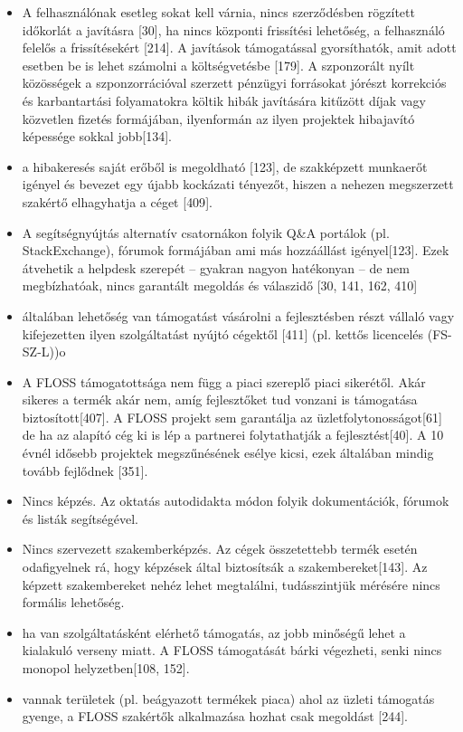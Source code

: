 \documentclass[12pt,magyar,a4paper,oneside]{scrreprt}
\providecommand{\tightlist}{%
  \setlength{\itemsep}{0pt}\setlength{\parskip}{0pt}}
\begin{document}
\begin{itemize}
\tightlist
\item
  A felhasználónak esetleg sokat kell várnia, nincs szerződésben
  rögzített időkorlát a javításra {[}30{]}, ha nincs központi frissítési
  lehetőség, a felhasználó felelős a frissítésekért {[}214{]}. A
  javítások támogatással gyorsíthatók, amit adott esetben be is lehet
  számolni a költségvetésbe {[}179{]}. A szponzorált nyílt közösségek a
  szponzorrációval szerzett pénzügyi forrásokat jórészt korrekciós és
  karbantartási folyamatokra költik hibák javítására kitűzött díjak vagy
  közvetlen fizetés formájában, ilyenformán az ilyen projektek
  hibajavító képessége sokkal jobb{[}134{]}.
\item
  a hibakeresés saját erőből is megoldható {[}123{]}, de szakképzett
  munkaerőt igényel és bevezet egy újabb kockázati tényezőt, hiszen a
  nehezen megszerzett szakértő elhagyhatja a céget {[}409{]}.
\item
  A segítségnyújtás alternatív csatornákon folyik Q\&A portálok (pl.
  StackExchange), fórumok formájában ami más hozzáállást
  igényel{[}123{]}. Ezek átvehetik a helpdesk szerepét -- gyakran nagyon
  hatékonyan -- de nem megbízhatóak, nincs garantált megoldás és
  válaszidő {[}30, 141, 162, 410{]}
\item
  általában lehetőség van támogatást vásárolni a fejlesztésben részt
  vállaló vagy kifejezetten ilyen szolgáltatást nyújtó cégektől
  {[}411{]} (pl. kettős licencelés (FS-SZ-L))o
\item
  A FLOSS támogatottsága nem függ a piaci szereplő piaci sikerétől. Akár
  sikeres a termék akár nem, amíg fejlesztőket tud vonzani is támogatása
  biztosított{[}407{]}. A FLOSS projekt sem garantálja az
  üzletfolytonosságot{[}61{]} de ha az alapító cég ki is lép a partnerei
  folytathatják a fejlesztést{[}40{]}. A 10 évnél idősebb projektek
  megszűnésének esélye kicsi, ezek általában mindig tovább fejlődnek
  {[}351{]}.
\item
  Nincs képzés. Az oktatás autodidakta módon folyik dokumentációk,
  fórumok és listák segítségével.
\item
  Nincs szervezett szakemberképzés. Az cégek összetettebb termék esetén
  odafigyelnek rá, hogy képzések által biztosítsák a
  szakembereket{[}143{]}. Az képzett szakembereket nehéz lehet
  megtalálni, tudásszintjük mérésére nincs formális lehetőség.
\item
  ha van szolgáltatásként elérhető támogatás, az jobb minőségű lehet a
  kialakuló verseny miatt. A FLOSS támogatását bárki végezheti, senki
  nincs monopol helyzetben{[}108, 152{]}.
\item
  vannak területek (pl. beágyazott termékek piaca) ahol az üzleti
  támogatás gyenge, a FLOSS szakértők alkalmazása hozhat csak megoldást
  {[}244{]}.
\end{itemize}
\end{document}
